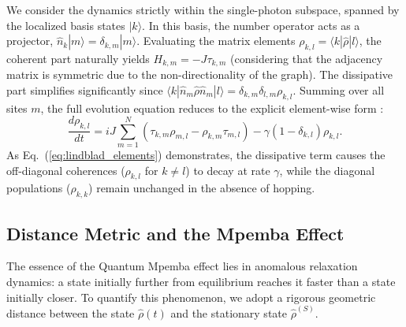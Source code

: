 \documentclass[pdflatex,sn-mathphys-num]{sn-jnl}
\begin{document}
We consider the dynamics strictly within the single-photon subspace, spanned by the localized basis states $|k\rangle$. In this basis, the number operator acts as a projector, $\hat{n}_k|m\rangle = \delta_{k,m}|m\rangle$. Evaluating the matrix elements $\rho_{k,l} = \langle k|\hat{\rho}|l\rangle$, the coherent part naturally yields $H_{k,m} = -J\tau_{k,m}$ (considering that the adjacency matrix is symmetric due to the non-directionality of the graph). The dissipative part simplifies significantly since $\langle k| \hat{n}_m \hat{\rho} \hat{n}_m |l\rangle = \delta_{k,m}\delta_{l,m}\rho_{k,l}$. Summing over all sites $m$, the full evolution equation reduces to the explicit element-wise form \cite{Longhi2024}:
\begin{equation}
\frac{d\rho_{k,l}}{dt} = iJ \sum_{m=1}^{N} (\tau_{k,m}\rho_{m,l} - \rho_{k,m}\tau_{m,l}) - \gamma(1-\delta_{k,l})\rho_{k,l}.
\label{eq:lindblad_elements}
\end{equation}
As Eq.~(\ref{eq:lindblad_elements}) demonstrates, the dissipative term causes the off-diagonal coherences ($\rho_{k,l}$ for $k \neq l$) to decay at rate $\gamma$, while the diagonal populations ($\rho_{k,k}$) remain unchanged in the absence of hopping.

\subsection{Distance Metric and the Mpemba Effect}
The essence of the Quantum Mpemba effect lies in anomalous relaxation dynamics: a state initially further from equilibrium reaches it faster than a state initially closer. To quantify this phenomenon, we adopt a rigorous geometric distance between the state $\hat{\rho}(t)$ and the stationary state $\hat{\rho}^{(S)}$.
\end{document}

